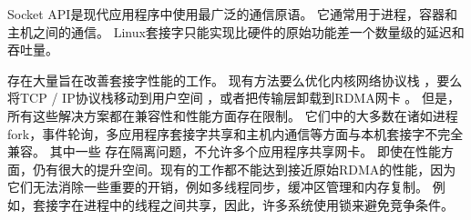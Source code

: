 
Socket API是现代应用程序中使用最广泛的通信原语。 它通常用于进程，容器和主机之间的通信。
Linux套接字只能实现比硬件的原始功能差一个数量级的延迟和吞吐量。

存在大量旨在改善套接字性能的工作。
现有方法要么优化内核网络协议栈 \cite {lin2016scalable,han2012megapipe,yasukata2016stackmap}，要么将TCP / IP协议栈移动到用户空间 \cite {jeong2014mtcp,marinos2014network,seastar,fstack,libvma}，或者把传输层卸载到RDMA网卡 \cite{rsockets,socketsdirect}。
但是，所有这些解决方案都在兼容性和性能方面存在限制。
它们中的大多数在诸如进程 fork，事件轮询，多应用程序套接字共享和主机内通信等方面与本机套接字不完全兼容。
其中一些 \cite {jeong2014mtcp}存在隔离问题，不允许多个应用程序共享网卡。
即使在性能方面，仍有很大的提升空间。现有的工作都不能达到接近原始RDMA的性能，因为它们无法消除一些重要的开销，例如多线程同步，缓冲区管理和内存复制。
例如，套接字在进程中的线程之间共享，因此，许多系统使用锁来避免竞争条件。

